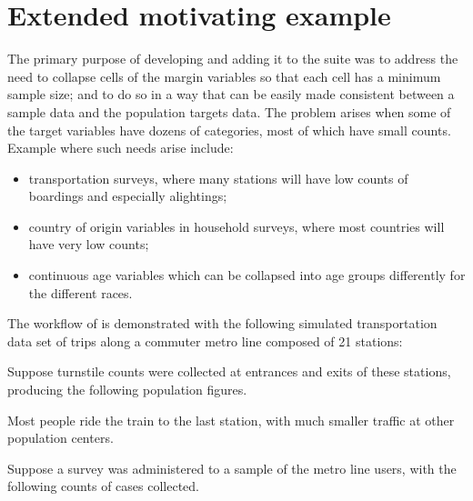 
\section{Extended motivating example}
\label{subsec:example}

The primary purpose of developing  and adding it to the  
suite was to address the need
to collapse cells of the margin variables so that each cell has a minimum sample size;
and to do so in a way that can be easily made consistent between a sample data
and the population targets data. The problem arises when some of the target
variables have dozens of categories, most of which have small counts.
Example where such needs arise include:
\begin{itemize}
    \item transportation surveys, where many stations will have 
        low counts of boardings and especially alightings;
    \item country of origin variables in household surveys,
        where most countries will have very low counts;
    \item continuous age variables which can be collapsed into
        age groups differently for the different races.
\end{itemize}

The workflow of  is demonstrated with the following
simulated transportation data set of trips along a commuter metro line composed of 21 stations:

\begin{stlog}
\nullskip
\end{stlog}

Suppose turnstile counts were collected at entrances and exits of these stations, 
producing the following population figures.

\cnp

\label{page:station:daypart}

\noindent
\begin{stlog}
\nullskip
\end{stlog}

Most people ride the train to the last station, with much smaller traffic at other population centers.

Suppose a survey was administered to a sample of the metro line users, with the following counts
of cases collected.


